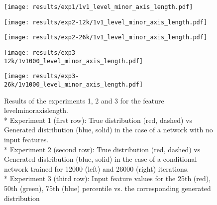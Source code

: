 \begin{figure}[h!]
	\begin{minipage}{0.5\linewidth}
		\texttt{[image: results/exp1/1v1\_level\_minor\_axis\_length.pdf]}
	\end{minipage}
	
	\begin{minipage}{0.5\linewidth}
		\texttt{[image: results/exp2-12k/1v1\_level\_minor\_axis\_length.pdf]}
	\end{minipage}
	\begin{minipage}{0.5\linewidth}
		\texttt{[image: results/exp2-26k/1v1\_level\_minor\_axis\_length.pdf]}
	\end{minipage}
	
	\begin{minipage}{0.5\linewidth}
		\texttt{[image: results/exp3-12k/1v1000\_level\_minor\_axis\_length.pdf]}
	\end{minipage}
	\begin{minipage}{0.5\linewidth}
		\texttt{[image: results/exp3-26k/1v1000\_level\_minor\_axis\_length.pdf]}
	\end{minipage}
	\caption[ Results: Input feature level\textunderscore minor\textunderscore axis\textunderscore length]{ Results of the experiments 1, 2 and 3 for the feature level\textunderscore minor\textunderscore axis\textunderscore length. \\* Experiment 1 (first row): True distribution (red, dashed) vs Generated distribution (blue, solid) in the case of a network with no input features. \\* Experiment 2 (second row): True distribution (red, dashed) vs Generated distribution (blue, solid) in the case of a conditional network trained for 12000 (left) and 26000 (right) iterations. \\* Experiment 3 (third row): Input feature values for the 25th (red), 50th (green), 75th (blue) percentile vs. the corresponding generated distribution}
	\label{fig:results_level_minor_axis_length}
\end{figure}
